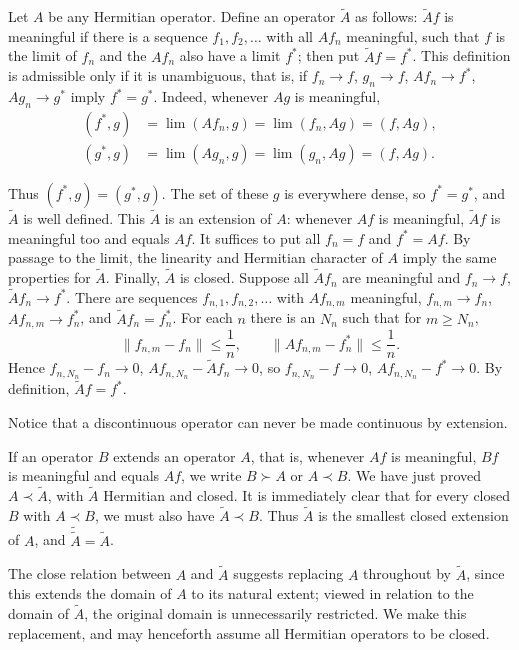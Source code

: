 \documentclass[fontsize=13pt,twoside,openany,headings=normal,parskip=false,bookmarkpackage=false,DIV=calc]{scrbook}
\begin{document}
Let $A$ be any Hermitian operator. Define an operator $\widetilde A$ as follows: $\widetilde Af$ is meaningful if there is a sequence $f_1,f_2,\ldots$ with all $Af_n$ meaningful, such that $f$ is the limit of $f_n$ and the $Af_n$ also have a limit $f^*$; then put $\widetilde Af=f^*$. This definition is admissible only if it is unambiguous, that is, if $f_n\to f$, $g_n\to f$, $Af_n\to f^*$, $Ag_n\to g^*$ imply $f^*=g^*$. Indeed, whenever $Ag$ is meaningful,
\begin{align*}
(f^*,g)&=\lim(Af_n,g)=\lim(f_n,Ag)=(f,Ag),\\
(g^*,g)&=\lim(Ag_n,g)=\lim(g_n,Ag)=(f,Ag).
\end{align*}

\hypertarget{origpage-77}{}%
Thus $(f^*,g)=(g^*,g)$. The set of these $g$ is everywhere dense, so $f^*=g^*$, and $\widetilde A$ is well defined. This $\widetilde A$ is an extension of $A$: whenever $Af$ is meaningful, $\widetilde Af$ is meaningful too and equals $Af$. It suffices to put all $f_n=f$ and $f^*=Af$. By passage to the limit, the linearity and Hermitian character of $A$ imply the same properties for $\widetilde A$. Finally, $\widetilde A$ is closed. Suppose all $\widetilde Af_n$ are meaningful and $f_n\to f$, $\widetilde Af_n\to f^*$. There are sequences $f_{n,1},f_{n,2},\ldots$ with $Af_{n,m}$ meaningful, $f_{n,m}\to f_n$, $Af_{n,m}\to f_n^*$, and $\widetilde Af_n=f_n^*$. For each $n$ there is an $N_n$ such that for $m\geq N_n$,
\[
\|f_{n,m}-f_n\|\leq\frac1n,\qquad\|Af_{n,m}-f_n^*\|\leq\frac1n.
\]
Hence $f_{n,N_n}-f_n\to0$, $Af_{n,N_n}-\widetilde Af_n\to0$, so $f_{n,N_n}-f\to0$, $Af_{n,N_n}-f^*\to0$. By definition, $\widetilde Af=f^*$.

Notice that a discontinuous operator can never be made continuous by extension.

If an operator $B$ extends an operator $A$, that is, whenever $Af$ is meaningful, $Bf$ is meaningful and equals $Af$, we write $B\succ A$ or $A\prec B$. We have just proved $A\prec\widetilde A$, with $\widetilde A$ Hermitian and closed. It is immediately clear that for every closed $B$ with $A\prec B$, we must also have $\widetilde A\prec B$. Thus $\widetilde A$ is the smallest closed extension of $A$, and $\widetilde{\widetilde A}=\widetilde A$.

The close relation between $A$ and $\widetilde A$ suggests replacing $A$ throughout by $\widetilde A$, since this extends the domain of $A$ to its natural extent; viewed in relation to the domain of $\widetilde A$, the original domain is unnecessarily restricted. We make this replacement, and may henceforth assume all Hermitian operators to be closed.
\end{document}

